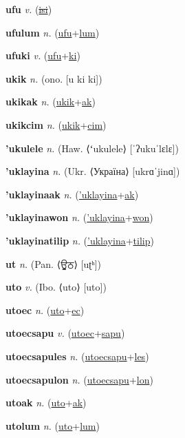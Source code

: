 \textbf{\hypertarget{ufu}{ufu}} \textit{v.} (\hyperlink{isi}{\sout{isi}})


\textbf{\hypertarget{ufulum}{ufulum}} \textit{n.} (\hyperlink{ufu}{ufu}+\allowbreak \hyperlink{lum}{lum})


\textbf{\hypertarget{ufuki}{ufuki}} \textit{v.} (\hyperlink{ufu}{ufu}+\allowbreak \hyperlink{ki}{ki})


\textbf{\hypertarget{ukik}{ukik}} \textit{n.} (ono. [u ki ki])


\textbf{\hypertarget{ukikak}{ukikak}} \textit{n.} (\hyperlink{ukik}{ukik}+\allowbreak \hyperlink{ak}{ak})


\textbf{\hypertarget{ukikcim}{ukikcim}} \textit{n.} (\hyperlink{ukik}{ukik}+\allowbreak \hyperlink{cim}{cim})


\textbf{\hypertarget{'ukulele}{'ukulele}} \textit{n.} (Haw. ⟨ʻukulele⟩ [ˈʔukuˈlɛlɛ])


\textbf{\hypertarget{'uklayina}{'uklayina}} \textit{n.} (Ukr. ⟨Україна⟩ [ukrɑˈjinɑ])


\textbf{\hypertarget{'uklayinaak}{'uklayinaak}} \textit{n.} (\hyperlink{'uklayina}{'uklayina}+\allowbreak \hyperlink{ak}{ak})


\textbf{\hypertarget{'uklayinawon}{'uklayinawon}} \textit{n.} (\hyperlink{'uklayina}{'uklayina}+\allowbreak \hyperlink{won}{won})


\textbf{\hypertarget{'uklayinatilip}{'uklayinatilip}} \textit{n.} (\hyperlink{'uklayina}{'uklayina}+\allowbreak \hyperlink{tilip}{tilip})


\textbf{\hypertarget{ut}{ut}} \textit{n.} (Pan. ⟨{\gurmukhi{}ਊਠ}⟩ [uʈʰ])


\textbf{\hypertarget{uto}{uto}} \textit{v.} (Ibo. ⟨uto⟩ [uto])


\textbf{\hypertarget{utoec}{utoec}} \textit{n.} (\hyperlink{uto}{uto}+\allowbreak \hyperlink{ec}{ec})


\textbf{\hypertarget{utoecsapu}{utoecsapu}} \textit{v.} (\hyperlink{utoec}{utoec}+\allowbreak \hyperlink{sapu}{sapu})


\textbf{\hypertarget{utoecsapules}{utoecsapules}} \textit{n.} (\hyperlink{utoecsapu}{utoecsapu}+\allowbreak \hyperlink{les}{les})


\textbf{\hypertarget{utoecsapulon}{utoecsapulon}} \textit{n.} (\hyperlink{utoecsapu}{utoecsapu}+\allowbreak \hyperlink{lon}{lon})


\textbf{\hypertarget{utoak}{utoak}} \textit{n.} (\hyperlink{uto}{uto}+\allowbreak \hyperlink{ak}{ak})


\textbf{\hypertarget{utolum}{utolum}} \textit{n.} (\hyperlink{uto}{uto}+\allowbreak \hyperlink{lum}{lum})


